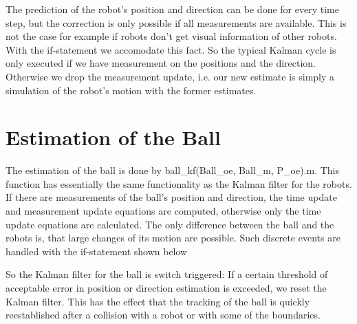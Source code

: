 The prediction of the robot's position and direction can be done for every time step, but the correction is only possible if all measurements are available. This is not the case for example if robots don't get visual information of other robots. With the if-statement we accomodate this fact. So the typical Kalman cycle is only executed if we have measurement on the positions and the direction. Otherwise we drop the measurement update, i.e. our new estimate is simply a simulation of the robot's motion with the former estimates.
\parskip 10pt


\section{Estimation of the Ball}

The estimation of the ball is done by {\selectfont ball\_kf(Ball\_oe, Ball\_m, P\_oe).m}. This function has essentially the same functionality as the Kalman filter for the robots. If there are measurements of the ball's position and direction, the time update and measurement update equations are computed, otherwise only the time update equations are calculated. The only difference between the ball and the robots is, that large changes of its motion are possible. Such discrete events are handled with the if-statement shown below



So the Kalman filter for the ball is switch triggered: If a certain threshold of acceptable error in position or direction estimation is exceeded, we reset the Kalman filter. This has the effect that the tracking of the ball is quickly reestablished after a collision with a robot or with some of the boundaries.



